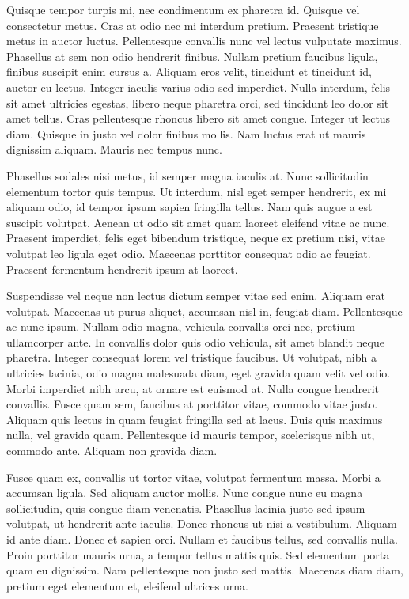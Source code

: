 \documentclass{homework}
\begin{document}
Quisque tempor turpis mi, nec condimentum ex pharetra id. Quisque vel consectetur metus. Cras at odio nec mi interdum pretium. Praesent tristique metus in auctor luctus. Pellentesque convallis nunc vel lectus vulputate maximus. Phasellus at sem non odio hendrerit finibus. Nullam pretium faucibus ligula, finibus suscipit enim cursus a. Aliquam eros velit, tincidunt et tincidunt id, auctor eu lectus. Integer iaculis varius odio sed imperdiet. Nulla interdum, felis sit amet ultricies egestas, libero neque pharetra orci, sed tincidunt leo dolor sit amet tellus. Cras pellentesque rhoncus libero sit amet congue. Integer ut lectus diam. Quisque in justo vel dolor finibus mollis. Nam luctus erat ut mauris dignissim aliquam. Mauris nec tempus nunc.

Phasellus sodales nisi metus, id semper magna iaculis at. Nunc sollicitudin elementum tortor quis tempus. Ut interdum, nisl eget semper hendrerit, ex mi aliquam odio, id tempor ipsum sapien fringilla tellus. Nam quis augue a est suscipit volutpat. Aenean ut odio sit amet quam laoreet eleifend vitae ac nunc. Praesent imperdiet, felis eget bibendum tristique, neque ex pretium nisi, vitae volutpat leo ligula eget odio. Maecenas porttitor consequat odio ac feugiat. Praesent fermentum hendrerit ipsum at laoreet.

Suspendisse vel neque non lectus dictum semper vitae sed enim. Aliquam erat volutpat. Maecenas ut purus aliquet, accumsan nisl in, feugiat diam. Pellentesque ac nunc ipsum. Nullam odio magna, vehicula convallis orci nec, pretium ullamcorper ante. In convallis dolor quis odio vehicula, sit amet blandit neque pharetra. Integer consequat lorem vel tristique faucibus. Ut volutpat, nibh a ultricies lacinia, odio magna malesuada diam, eget gravida quam velit vel odio. Morbi imperdiet nibh arcu, at ornare est euismod at. Nulla congue hendrerit convallis. Fusce quam sem, faucibus at porttitor vitae, commodo vitae justo. Aliquam quis lectus in quam feugiat fringilla sed at lacus. Duis quis maximus nulla, vel gravida quam. Pellentesque id mauris tempor, scelerisque nibh ut, commodo ante. Aliquam non gravida diam.

Fusce quam ex, convallis ut tortor vitae, volutpat fermentum massa. Morbi a accumsan ligula. Sed aliquam auctor mollis. Nunc congue nunc eu magna sollicitudin, quis congue diam venenatis. Phasellus lacinia justo sed ipsum volutpat, ut hendrerit ante iaculis. Donec rhoncus ut nisi a vestibulum. Aliquam id ante diam. Donec et sapien orci. Nullam et faucibus tellus, sed convallis nulla. Proin porttitor mauris urna, a tempor tellus mattis quis. Sed elementum porta quam eu dignissim. Nam pellentesque non justo sed mattis. Maecenas diam diam, pretium eget elementum et, eleifend ultrices urna.
\end{document}
